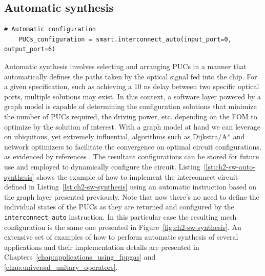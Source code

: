 \subsection{Automatic synthesis}\label{sub:automatic_synthesis} %

\begin{lstlisting}[caption={Automatic synthesis of a basic circuit using the first-generation Smartlight API}, label=lst:ch2-sw-auto-synthesis]
	# Automatic configuration
	PUCs_configuration = smart.interconnect_auto(input_port=0, output_port=6)
	\end{lstlisting}

Automatic synthesis involves selecting and arranging PUCs in a manner that automatically defines the paths taken by the optical signal fed into the chip.
For a given specification, such as achieving a 10 ns delay between two specific optical ports, multiple solutions may exist.
In this context, a software layer powered by a graph model is capable of determining the configuration solutions that minimize the number of PUCs required, the driving power, etc. depending on the FOM to optimize by the solution of interest.
With a graph model at hand we can leverage on ubiquitous, yet extremely influential, algorithms such as Dijkstra/A* \cite{bierlaire_optimization_2015} and network optimizers to facilitate the convergence on optimal circuit configurations, as evidenced by references \cite{lopez_auto-routing_2020,perez-lopez_multipurpose_2020}.
The resultant configurations can be stored for future use and employed to dynamically configure the circuit.
Listing~\ref{lst:ch2-sw-auto-synthesis} shows the example of how to implement the interconnect circuit defined in Listing~\ref{lst:ch2-sw-synthesis} using an automatic instruction based on the graph layer presented previously.
Note that now there's no need to define the individual states of the PUCs as they are returned and configured by the \lstinline{interconnect_auto} instruction.
In this particular case the resulting mesh configuration is the same one presented in Figure~\ref{fig:ch2-sw-synthesis}.
An extensive set of examples of how to perform automatic synthesis of several applications and their implementation details are presented in Chapters~\ref{chap:applications_using_fppgas} and \ref{chap:universal_unitary_operators}.


